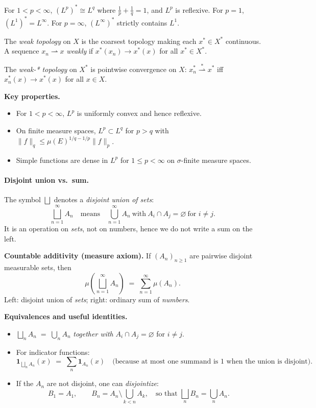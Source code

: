 \documentclass[12pt,a4paper]{article}
\theoremstyle{plain}
\theoremstyle{definition}
\theoremstyle{remark}
\theoremstyle{remark}
\theoremstyle{definition}
\begin{document}
\medskip
For $1<p<\infty$, $(L^p)^*\cong L^q$ where $\frac1p+\frac1q=1$,
and $L^p$ is reflexive.
For $p=1$, $(L^1)^*=L^\infty$.
For $p=\infty$, $(L^\infty)^*$ strictly contains $L^1$.

\medskip
The \emph{weak topology} on $X$ is the coarsest topology making each $x^*\in X^*$
continuous.
A sequence $x_n\rightharpoonup x$ \emph{weakly} if
$x^*(x_n)\to x^*(x)$ for all $x^*\in X^*$.

The \emph{weak-* topology} on $X^*$ is pointwise convergence on $X$:
$x_n^*\stackrel{*}{\rightharpoonup}x^*$ iff $x_n^*(x)\to x^*(x)$ for all $x\in X$.

\bigskip
\textbf{Key properties.}

\begin{itemize}
	\item For $1<p<\infty$, $L^p$ is uniformly convex and hence reflexive.
	\item On finite measure spaces, $L^p\subset L^q$ for $p>q$
	with $\|f\|_q\le\mu(E)^{1/q-1/p}\|f\|_p$.
	\item Simple functions are dense in $L^p$ for $1\le p<\infty$
	on $\sigma$-finite measure spaces.
\end{itemize}

\paragraph{Disjoint union vs.\ sum.}
The symbol $\bigsqcup$ denotes a \emph{disjoint union of sets}:
\[
\bigsqcup_{n=1}^\infty A_n
\quad\text{means}\quad
\bigcup_{n=1}^\infty A_n \ \text{with}\ A_i\cap A_j=\varnothing\ \text{for }i\neq j.
\]
It is an operation on \emph{sets}, not on numbers, hence we do not write a sum on the left.

\medskip
\textbf{Countable additivity (measure axiom).}
If $(A_n)_{n\ge1}$ are pairwise disjoint measurable sets, then
\[
\mu\!\left(\bigsqcup_{n=1}^\infty A_n\right)
\;=\;
\sum_{n=1}^\infty \mu(A_n).
\]
Left: disjoint union of \emph{sets}; right: ordinary sum of \emph{numbers}.

\medskip
\textbf{Equivalences and useful identities.}
\begin{itemize}
	\item $\displaystyle \bigsqcup_{n} A_n \;=\; \bigcup_{n} A_n$ \emph{together with} $A_i\cap A_j=\varnothing$ for $i\neq j$.
	\item For indicator functions:
	\[
	\mathbf 1_{\bigsqcup_{n} A_n}(x)
	\;=\;
	\sum_{n} \mathbf 1_{A_n}(x)
	\quad\text{(because at most one summand is $1$ when the union is disjoint).}
	\]
	\item If the $A_n$ are not disjoint, one can \emph{disjointize}:
	\[
	B_1=A_1,\qquad B_n=A_n\setminus\bigcup_{k<n}A_k,
	\quad\text{so that } \bigsqcup_{n} B_n=\bigcup_{n} A_n.
	\]
\end{itemize}
\end{document}

